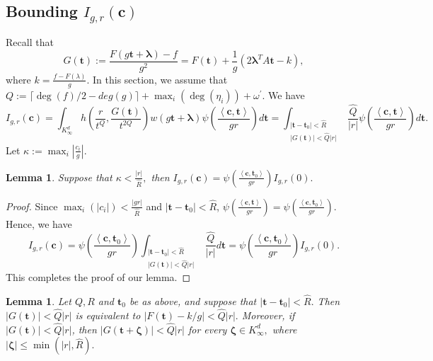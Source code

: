 \documentclass[11pt]{amsart}
\theoremstyle{plain}
\theoremstyle{plain}
\newtheorem{lemma}[theorem]{Lemma}
\renewcommand{\vec}[1]{\mathbf{#1}}
\theoremstyle{remark}
\theoremstyle{definition}
\newcommand{\Ki}{K_\infty}
\newcommand{\hQ}{\widehat{Q}}
\newcommand{\hR}{\widehat{R}}
\begin{document}
\subsection{Bounding $I_{g,r}(\vec{c})$}
Recall that 
\[G(\vec{t}):=\frac{F(g\vec{t}+\boldsymbol{\lambda})-f}{g^2}=F(\vec{t})+\frac{1}{g}(2\boldsymbol{\lambda}^T A\vec{t}-k),\]
where $k=\frac{f-F(\lambda)}{g}.$ In this section, we assume that $Q:=  \lceil{\deg(f)/2} -deg(g)\rceil +\max_{i}(\deg(\eta_i))+\omega^{\prime}.$ 
  We have  
\begin{equation}\label{intt}
I_{g,r}(\vec{c})= \int_{\Ki^d} h\left(\frac{r}{t^Q},\frac{G(\vec{t})}{t^{2Q}}\right) w(g\vec{t}+\boldsymbol{\lambda}) \psi\left(\frac{\left< \vec{c},\vec{t} \right>}{gr}    \right) d\vec{t}= \int_{\substack{|\vec{t}-\vec{t}_0| < \hR \\ |G(\vec{t})|< \hQ|r|}} \frac{\hQ}{|r|}  \psi\left(\frac{\left< \vec{c},\vec{t} \right>}{gr}    \right) d\vec{t}.
\end{equation}
 Let  $\kappa:=\max_{i} |\frac{c_i}{g }|.$ 
\begin{lemma}\label{noosc}
Suppose that $\kappa< \frac{|r|}{\hR},$ then  $I_{g,r}(\vec{c})= \psi\left(\frac{\left< \vec{c},\vec{t}_0 \right>}{gr}    \right) I_{g,r}(0).$
\end{lemma}
\begin{proof}
Since $\max_{i}(|c_i|)< \frac{|gr|}{\hR}$ and $|\vec{t}-\vec{t}_0|<\hR$,  $ \psi\left(\frac{\left< \vec{c},\vec{t} \right>}{gr}    \right)=\psi\left(\frac{\left< \vec{c},\vec{t}_0 \right>}{gr}    \right).$ 
Hence, we have 
\[
I_{g,r}(\vec{c})=\psi\left(\frac{\left< \vec{c},\vec{t}_0 \right>}{gr}    \right) \int_{\substack{|\vec{t}-\vec{t}_0| < \hR \\ |G(\vec{t})|< \hQ|r|}} \frac{\hQ}{|r|}   d\vec{t}= \psi\left(\frac{\left< \vec{c},\vec{t}_0 \right>}{gr}    \right) I_{g,r}(0).
\]
This completes the proof of our lemma. 
\end{proof}
\begin{lemma}\label{auxlem}
Let $Q, R$ and $\vec{t}_0$ be as above, and suppose that $|\vec{t}-\vec{t}_0|< \hR.$ Then $|G(\vec{t})| < \hQ|r|$ is equivalent to $|F(\vec{t})-k/g|<\hQ |r|.$ Moreover, if $|G(\vec{t})|< \hQ|r|$, then $|G(\vec{t}+\boldsymbol{\zeta})|  < \hQ|r|$ for every $\boldsymbol{\zeta}\in K_\infty^d,$ where $|\boldsymbol{\zeta}| \leq \min(|r|,\hR).$
\end{lemma}
\end{document}
